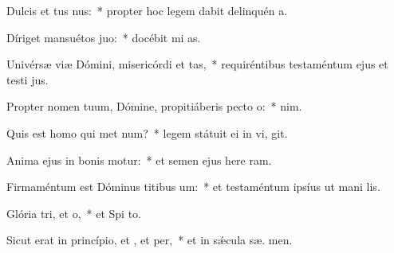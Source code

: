 \item Dulcis et tus nus:~* propter hoc legem dabit delinquén  a.
\item Díriget mansuétos  juo:~* docébit mi  as.
\item Univérsæ viæ Dómini, misericórdi et tas,~* requiréntibus testaméntum ejus et testi jus.
\item Propter nomen tuum, Dómine, propitiáberis pecto o:~*   nim.
\item Quis est homo qui met num?~* legem státuit ei in vi,  git.
\item Anima ejus in bonis motur:~* et semen ejus here ram.
\item Firmaméntum est Dóminus titibus um:~* et testaméntum ipsíus ut mani lis.
\item Glória tri, et o,~* et Spi to.
\item Sicut erat in princípio, et , et per,~* et in sǽcula sæ. men.
